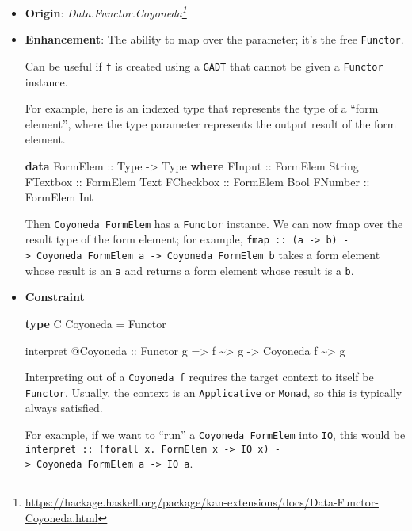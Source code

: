 \documentclass[]{article}
\newenvironment{Shaded}{}{}
\newcommand{\DataTypeTok}[1]{\textcolor[rgb]{0.56,0.13,0.00}{#1}}
\newcommand{\KeywordTok}[1]{\textcolor[rgb]{0.00,0.44,0.13}{\textbf{#1}}}
\newcommand{\NormalTok}[1]{#1}
\newcommand{\OperatorTok}[1]{\textcolor[rgb]{0.40,0.40,0.40}{#1}}
\newcommand{\OtherTok}[1]{\textcolor[rgb]{0.00,0.44,0.13}{#1}}
\renewcommand{\href}[2]{#2\footnote{\url{#1}}}
\begin{document}
\begin{itemize}
\item
  \textbf{Origin}:
  \emph{\href{https://hackage.haskell.org/package/kan-extensions/docs/Data-Functor-Coyoneda.html}{Data.Functor.Coyoneda}}
\item
  \textbf{Enhancement}: The ability to map over the parameter; it's the free
  \texttt{Functor}.

  Can be useful if \texttt{f} is created using a \texttt{GADT} that cannot be
  given a \texttt{Functor} instance.

  For example, here is an indexed type that represents the type of a ``form
  element'', where the type parameter represents the output result of the form
  element.

\begin{Shaded}
\begin{Highlighting}[]
\KeywordTok{data} \DataTypeTok{FormElem}\OtherTok{ ::} \DataTypeTok{Type} \OtherTok{{-}>} \DataTypeTok{Type} \KeywordTok{where}
    \DataTypeTok{FInput}\OtherTok{    ::} \DataTypeTok{FormElem} \DataTypeTok{String}
    \DataTypeTok{FTextbox}\OtherTok{  ::} \DataTypeTok{FormElem} \DataTypeTok{Text}
    \DataTypeTok{FCheckbox}\OtherTok{ ::} \DataTypeTok{FormElem} \DataTypeTok{Bool}
    \DataTypeTok{FNumber}\OtherTok{   ::} \DataTypeTok{FormElem} \DataTypeTok{Int}
\end{Highlighting}
\end{Shaded}

  Then \texttt{Coyoneda\ FormElem} has a \texttt{Functor} instance. We can now
  fmap over the result type of the form element; for example,
  \texttt{fmap\ ::\ (a\ -\textgreater{}\ b)\ -\textgreater{}\ Coyoneda\ FormElem\ a\ -\textgreater{}\ Coyoneda\ FormElem\ b}
  takes a form element whose result is an \texttt{a} and returns a form element
  whose result is a \texttt{b}.
\item
  \textbf{Constraint}

\begin{Shaded}
\begin{Highlighting}[]
\KeywordTok{type} \DataTypeTok{C} \DataTypeTok{Coyoneda} \OtherTok{=} \DataTypeTok{Functor}

\NormalTok{interpret }\OperatorTok{@}\DataTypeTok{Coyoneda}
\OtherTok{    ::} \DataTypeTok{Functor}\NormalTok{ g}
    \OtherTok{=>}\NormalTok{ f }\OperatorTok{\textasciitilde{}>}\NormalTok{ g}
    \OtherTok{{-}>} \DataTypeTok{Coyoneda}\NormalTok{ f }\OperatorTok{\textasciitilde{}>}\NormalTok{ g}
\end{Highlighting}
\end{Shaded}

  Interpreting out of a \texttt{Coyoneda\ f} requires the target context to
  itself be \texttt{Functor}. Usually, the context is an \texttt{Applicative} or
  \texttt{Monad}, so this is typically always satisfied.

  For example, if we want to ``run'' a \texttt{Coyoneda\ FormElem} into
  \texttt{IO}, this would be
  \texttt{interpret\ ::\ (forall\ x.\ FormElem\ x\ -\textgreater{}\ IO\ x)\ -\textgreater{}\ Coyoneda\ FormElem\ a\ -\textgreater{}\ IO\ a}.
\end{itemize}
\end{document}
